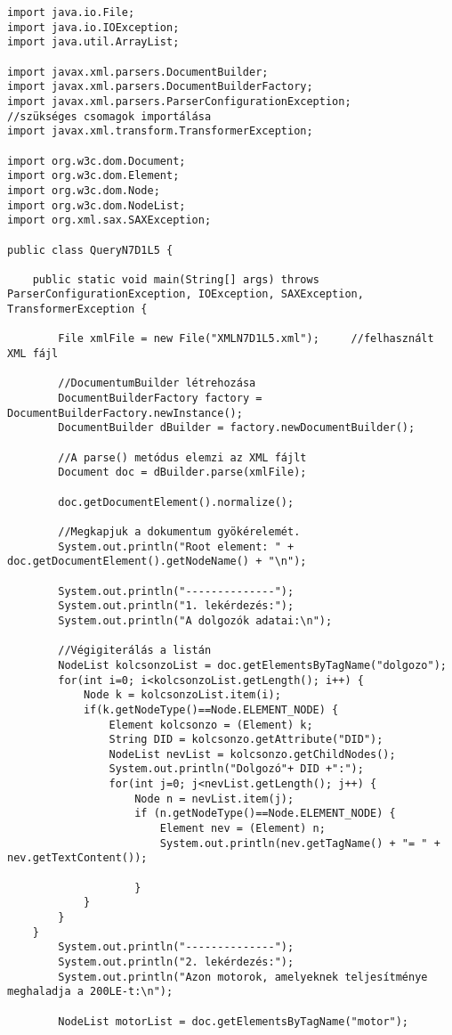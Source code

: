 \documentclass[14pt]{extarticle}
\begin{document}
\begin{normalsize}
\begin{verbatim}
import java.io.File;
import java.io.IOException;
import java.util.ArrayList;

import javax.xml.parsers.DocumentBuilder;
import javax.xml.parsers.DocumentBuilderFactory;
import javax.xml.parsers.ParserConfigurationException;      //szükséges csomagok importálása
import javax.xml.transform.TransformerException;

import org.w3c.dom.Document;
import org.w3c.dom.Element;
import org.w3c.dom.Node;
import org.w3c.dom.NodeList;
import org.xml.sax.SAXException;

public class QueryN7D1L5 {

	public static void main(String[] args) throws ParserConfigurationException, IOException, SAXException, TransformerException {

		File xmlFile = new File("XMLN7D1L5.xml");     //felhasznált XML fájl
		
		//DocumentumBuilder létrehozása
		DocumentBuilderFactory factory = DocumentBuilderFactory.newInstance();
		DocumentBuilder dBuilder = factory.newDocumentBuilder();
		
		//A parse() metódus elemzi az XML fájlt
		Document doc = dBuilder.parse(xmlFile);
		
		doc.getDocumentElement().normalize();
		
		//Megkapjuk a dokumentum gyökérelemét.
		System.out.println("Root element: " + doc.getDocumentElement().getNodeName() + "\n");
		
		System.out.println("--------------");
		System.out.println("1. lekérdezés:");
		System.out.println("A dolgozók adatai:\n");
		
		//Végigiterálás a listán
		NodeList kolcsonzoList = doc.getElementsByTagName("dolgozo");
		for(int i=0; i<kolcsonzoList.getLength(); i++) {
			Node k = kolcsonzoList.item(i);
			if(k.getNodeType()==Node.ELEMENT_NODE) {
				Element kolcsonzo = (Element) k;
				String DID = kolcsonzo.getAttribute("DID");
				NodeList nevList = kolcsonzo.getChildNodes();
				System.out.println("Dolgozó"+ DID +":");
				for(int j=0; j<nevList.getLength(); j++) {
					Node n = nevList.item(j);
					if (n.getNodeType()==Node.ELEMENT_NODE) {
						Element nev = (Element) n;
						System.out.println(nev.getTagName() + "= " + nev.getTextContent());
						
					}
			}
		}
	}
		System.out.println("--------------");
		System.out.println("2. lekérdezés:");
		System.out.println("Azon motorok, amelyeknek teljesítménye meghaladja a 200LE-t:\n");
		
		NodeList motorList = doc.getElementsByTagName("motor");
		

\end{verbatim}
\end{normalsize}
\end{document}
